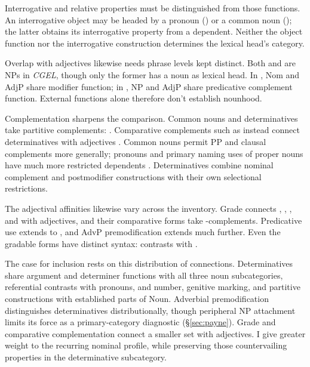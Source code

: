 \documentclass[12pt]{article}
\begin{document}
Interrogative and relative properties must be distinguished from those functions. An interrogative object may be headed by a pronoun () or a common noun (); the latter obtains its interrogative property from a dependent. Neither the object function nor the interrogative construction determines the lexical head's category.

Overlap with adjectives likewise needs phrase levels kept distinct. Both  and  are NPs in \textit{CGEL}, though only the former has a noun as lexical head. In , Nom and AdjP share modifier function; in , NP and AdjP share predicative complement function. External functions alone therefore don't establish nounhood.

Complementation sharpens the comparison. Common nouns and determinatives take partitive complements: . Comparative complements such as  instead connect determinatives with adjectives \citep[349--350, 392--394, 411--412, 432--433]{huddleston2002}. Common nouns permit PP and clausal complements more generally; pronouns and primary naming uses of proper nouns have much more restricted dependents \citep[429--430, 439--443, 517--521]{huddleston2002}. Determinatives combine nominal complement and postmodifier constructions with their own selectional restrictions.

The adjectival affinities likewise vary across the inventory. Grade connects , , , and  with adjectives, and their comparative forms take -complements. Predicative use extends to , and AdvP premodification extends much further. Even the gradable forms have distinct syntax:  contrasts with  \citep[392--396, 539--540]{huddleston2002}.

The case for inclusion rests on this distribution of connections. Determinatives share argument and determiner functions with all three noun subcategories, referential contrasts with pronouns, and number, genitive marking, and partitive constructions with established parts of Noun. Adverbial premodification distinguishes determinatives distributionally, though peripheral NP attachment limits its force as a primary-category diagnostic (§\ref{sec:payne}). Grade and comparative complementation connect a smaller set with adjectives. I give greater weight to the recurring nominal profile, while preserving those countervailing properties in the determinative subcategory.
\end{document}

